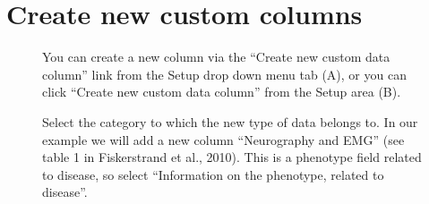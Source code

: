 \section{Create new custom columns}
\begin{figure}[ht]
  \begin{shaded}
		\caption{You can create a new column via the ``Create new custom data column'' link from the Setup drop down
		 menu tab (A), or you can click ``Create new custom data column'' from the Setup area (B).}
		\label{fig:create_column_I}
  \end{shaded}
\end{figure}

\begin{figure}[ht]
  \begin{shaded}
		\caption{Select the category to which the new type of data belongs to. 
		In our example we will add a new column ``Neurography and EMG'' (see table 1 in Fiskerstrand et al., 2010).
		This is a phenotype field related to disease, so select ``Information on the phenotype, related to disease''.}
		\label{fig:create_column_II}
  \end{shaded}
\end{figure}

